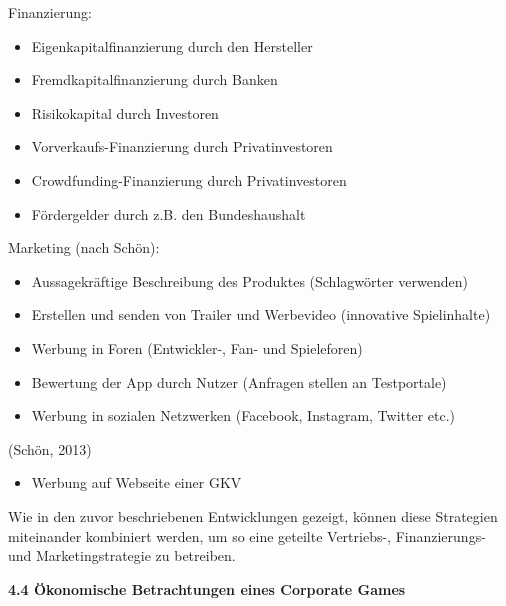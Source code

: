 \documentclass[
  a4paper,
  DIV=11,
  numbers=noendperiod,
  onecolumn,
  oneside,
  a4paper]{scrartcl}
\providecommand{\tightlist}{%
  \setlength{\itemsep}{0pt}\setlength{\parskip}{0pt}}
\begin{document}
Finanzierung:

\begin{itemize}
\tightlist
\item
  Eigenkapitalfinanzierung durch den Hersteller
\item
  Fremdkapitalfinanzierung durch Banken
\item
  Risikokapital durch Investoren
\item
  Vorverkaufs-Finanzierung durch Privatinvestoren
\item
  Crowdfunding-Finanzierung durch Privatinvestoren
\item
  Fördergelder durch z.B. den Bundeshaushalt
\end{itemize}

Marketing (nach Schön):

\begin{itemize}
\tightlist
\item
  Aussagekräftige Beschreibung des Produktes (Schlagwörter verwenden)
\item
  Erstellen und senden von Trailer und Werbevideo (innovative
  Spielinhalte)
\item
  Werbung in Foren (Entwickler-, Fan- und Spieleforen)
\item
  Bewertung der App durch Nutzer (Anfragen stellen an Testportale)
\item
  Werbung in sozialen Netzwerken (Facebook, Instagram, Twitter etc.)
\end{itemize}

(Schön, 2013)

\begin{itemize}
\tightlist
\item
  Werbung auf Webseite einer GKV
\end{itemize}

Wie in den zuvor beschriebenen Entwicklungen gezeigt, können diese
Strategien miteinander kombiniert werden, um so eine geteilte
Vertriebs-, Finanzierungs- und Marketingstrategie zu betreiben.

\textbf{4.4 Ökonomische Betrachtungen eines Corporate Games}
\end{document}
